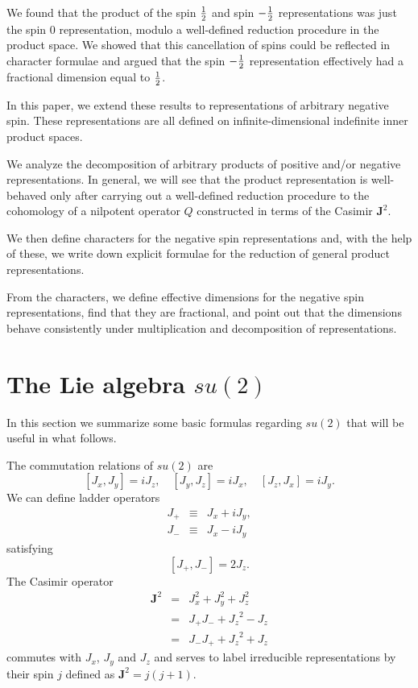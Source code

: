 \documentclass[a4paper,dvips,12pt]{article}
\newcommand {\half} {{1 \over 2}}
\begin{document}
    We found that
    the product of the spin $\half$ and spin $-\half$
    representations was
    just the spin $0$ representation, modulo a
    well-defined reduction procedure in the product space.  We
    showed that this cancellation of spins could be reflected in
    character formulae and argued that the spin $-\half$
    representation effectively had a fractional dimension equal to
    $\half$.

    In this paper, we extend these results to
    representations of arbitrary negative spin.  These
    representations are all defined on infinite-dimensional
    indefinite inner product spaces.

    We analyze the decomposition
    of arbitrary products of positive and/or negative representations.
    In general, we will see that the product representation
    is well-behaved only after carrying out a well-defined reduction procedure
    to the cohomology of a nilpotent operator $Q$ constructed in
    terms of
    the Casimir $\mathbf{J}^2$.

    We then define characters for the negative spin
    representations and, with the help of these, we write down
    explicit formulae for the reduction of general product
    representations.

    From the characters, we define effective dimensions for
    the negative spin representations, find that they are
    fractional, and point out that the dimensions behave
    consistently under multiplication and decomposition of
    representations.

    \section{The Lie algebra $su(2)$}

    In this section we summarize some basic formulas regarding $su(2)$
    that will be
    useful in what follows.

    The commutation relations of $su(2)$ are \cite{ELLIOTT}
    \[
        [J_x, J_y] = iJ_z,\quad [J_y, J_z] = iJ_x,\quad [J_z, J_x] =
        iJ_y.
    \]
    We can define ladder operators
    \begin{eqnarray}
        J_+ &\equiv &J_x + iJ_y, \nonumber \\
        J_- &\equiv &J_x - iJ_y  \label{LADDER}
    \end{eqnarray}
    satisfying
    \[
        [J_+, J_-] = 2 J_z.
    \]
    The Casimir operator
    \begin{eqnarray}
        \mathbf{J}^2 &=& J_x^2 + J_y^2 + J_z^2 \nonumber \\
        &=& J_+ J_- + {J_z}^2 - J_z \nonumber \\
        &=& J_- J_+ + {J_z}^2 + J_z
        \label{CASIMIR}
    \end{eqnarray}
    commutes with $J_x$, $J_y$ and $J_z$ and serves to label
    irreducible representations by their spin $j$ defined as $\mathbf{J}^2 =
    j(j+1)$.
\end{document}
